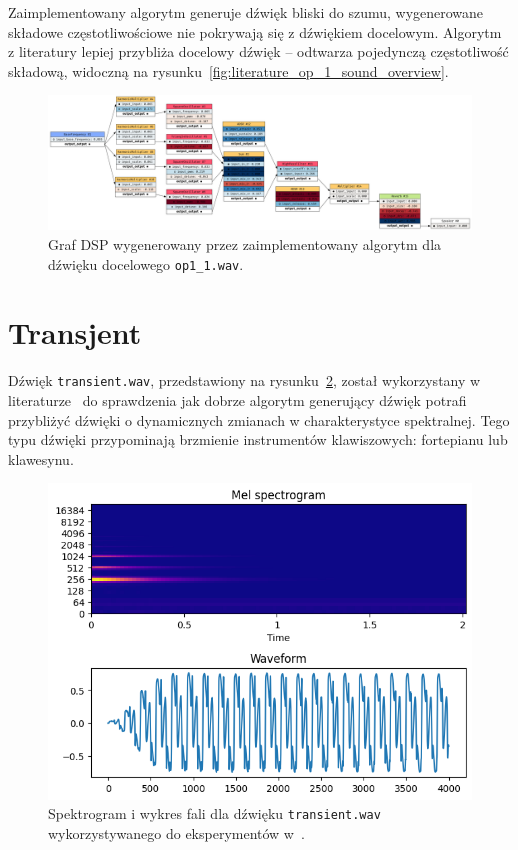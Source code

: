 Zaimplementowany algorytm generuje dźwięk bliski do szumu, wygenerowane
składowe częstotliwościowe nie pokrywają się z dźwiękiem docelowym.
Algorytm z literatury lepiej przybliża docelowy dźwięk -- odtwarza
pojedynczą częstotliwość składową, widoczną na rysunku~\ref{fig:literature_op_1_sound_overview}.

\begin{figure}[H]
    \centering
    \includegraphics[angle=90,width=0.45\linewidth]{rys06/evolved_graph_op1.png}
    \caption{
      Graf DSP wygenerowany przez zaimplementowany algorytm
      dla dźwięku docelowego \texttt{op1\_1.wav}.
    }\label{fig:evolved_literature_op1_sound_overview}
\end{figure}

\section{Transjent}

Dźwięk \texttt{transient.wav}, przedstawiony na rysunku~\ref{fig:literature_transient_sound_overview},
został wykorzystany w literaturze~\cite{evolutionary_puredata} do sprawdzenia jak dobrze algorytm
generujący dźwięk potrafi przybliżyć dźwięki o dynamicznych zmianach w charakterystyce spektralnej.
Tego typu dźwięki przypominają brzmienie instrumentów klawiszowych: fortepianu lub klawesynu.

\begin{figure}[H]
    \centering
    \includegraphics[width=0.7\linewidth]{rys06/transient_sample_literature.png}
    \caption{
      Spektrogram i wykres fali dla dźwięku \texttt{transient.wav} wykorzystywanego
      do eksperymentów w~\cite{evolutionary_puredata_results}.
    }\label{fig:literature_transient_sound_overview}
\end{figure}

